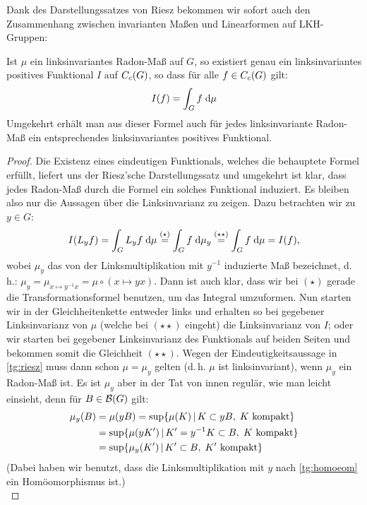 \bigskip
Dank des Darstellungssatzes von Riesz bekommen wir sofort auch den Zusammenhang
zwischen invarianten Maßen und Linearformen auf LKH-Gruppen:
\begin{thLemma}
    \label{tg:rmeasuresVSfunctionals}
    Ist $\mu$ ein linksinvariantes Radon-Maß auf $G$, so existiert genau ein
    linksinvariantes positives Funktional $I$ auf $C_c(G)$, 
    so dass für alle $f\in C_c(G)$ gilt:
    \[ I(f) = \int_G f \;\mathrm{d} \mu \]
    Umgekehrt erhält man aus dieser Formel auch für jedes linksinvariante
    Radon-Maß ein entsprechendes linksinvariantes positives Funktional.
\end{thLemma}

\begin{proof}
    Die Existenz eines eindeutigen Funktionals, welches die behauptete Formel
    erfüllt, liefert uns der Riesz'sche Darstellungssatz  und
    umgekehrt ist klar, dass jedes Radon-Maß durch die Formel ein solches
    Funktional induziert. Es bleiben also nur die Aussagen über die
    Linksinvarianz zu zeigen. Dazu betrachten wir zu $y\in G$:
    \[ I(L_yf) = \int_G L_yf \;\mathrm{d} \mu 
        \overset{(\star)}{=}
        \int_G f \;\mathrm{d} \mu_y 
        \overset{(\star\star)}{=} 
        \int_G f \;\mathrm{d} \mu = I(f)
    , \]
    wobei $\mu_y$ das von der Linksmultiplikation mit $y^{-1}$ induzierte
    Maß bezeichnet, d.\,h.:
    $\mu_y = \mu_{x\mapsto y^{-1}x} = \mu \circ (x\mapsto yx)$.
    Dann ist auch klar, dass wir bei $(\star)$ gerade die Transformationsformel
     benutzen, um das Integral umzuformen. 
    Nun starten wir in der Gleichheitenkette entweder links und erhalten so bei
    gegebener Linksinvarianz von $\mu$ (welche bei $(\star\star)$ eingeht)
    die Linksinvarianz von $I$; oder wir starten bei gegebener Linksinvarianz
    des Funktionals auf beiden Seiten und bekommen somit die Gleichheit
    $(\star\star)$. Wegen der Eindeutigkeitsaussage in \cref{tg:riesz} muss dann
    schon $\mu=\mu_y$ gelten (d.\,h. $\mu$ ist linksinvariant), 
    wenn $\mu_y$ ein Radon-Maß ist. Es ist $\mu_y$ aber in der Tat von innen
    regulär, wie man leicht einsieht, denn für $B\in\mathcal{B}(G)$ gilt:
    \begin{align*}
        \mu_y(B) &= \mu(yB)                                                 %
        = \sup\{ \mu(K) \Mid K\subset yB,\; K\text{ kompakt} \}             \\
        &= \sup\{ \mu(yK') \Mid K'=y^{-1}K\subset B,\; K\text{ kompakt} \}  \\
        &= \sup\{ \mu_y(K') \Mid K'\subset B,\; K'\text{ kompakt} \}        %
    \end{align*}
    (Dabei haben wir benutzt, dass die Linksmultiplikation mit $y$ nach
    \cref{tg:homoeom} ein Homöomorphismus ist.)
    \\
\end{proof}


